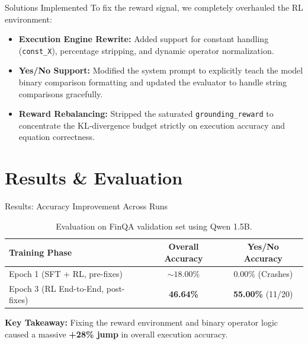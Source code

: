 \documentclass[aspectratio=169]{beamer}
\begin{document}
\begin{frame}{Solutions Implemented}
    To fix the reward signal, we completely overhauled the RL environment:
    \begin{itemize}
        \item \textbf{Execution Engine Rewrite:} Added support for constant handling (\texttt{const\_X}), percentage stripping, and dynamic operator normalization.
        \item \textbf{Yes/No Support:} Modified the system prompt to explicitly teach the model binary comparison formatting and updated the evaluator to handle string comparisons gracefully.
        \item \textbf{Reward Rebalancing:} Stripped the saturated \texttt{grounding\_reward} to concentrate the KL-divergence budget strictly on execution accuracy and equation correctness.
    \end{itemize}
\end{frame}

\section{Results \& Evaluation}
\begin{frame}{Results: Accuracy Improvement Across Runs}
    \begin{table}[]
        \centering
        \begin{tabular}{lcc}
            \toprule
            \textbf{Training Phase} & \textbf{Overall Accuracy} & \textbf{Yes/No Accuracy} \\
            \midrule
            Epoch 1 (SFT + RL, pre-fixes) & $\sim 18.00\%$ & $0.00\%$ (Crashes) \\
            Epoch 3 (RL End-to-End, post-fixes) & \textbf{46.64\%} & \textbf{55.00\%} (11/20) \\
            \bottomrule
        \end{tabular}
        \caption{Evaluation on FinQA validation set using Qwen 1.5B.}
    \end{table}
    
    \vspace{0.3cm}
    \textbf{Key Takeaway:} Fixing the reward environment and binary operator logic caused a massive \textbf{+28\% jump} in overall execution accuracy.
\end{frame}
\end{document}
